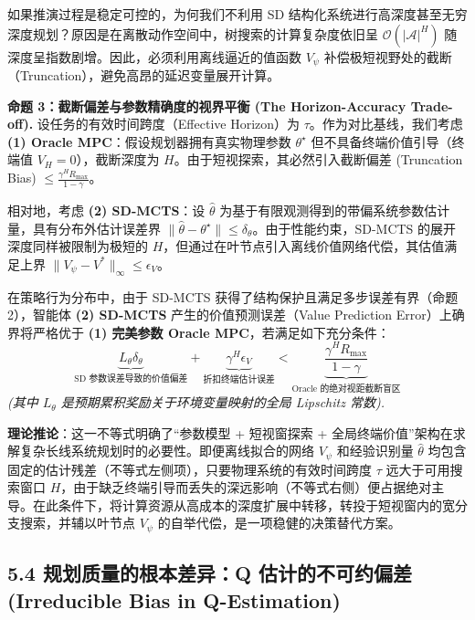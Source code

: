 \documentclass[UTF8]{ctexart}
\begin{document}
如果推演过程是稳定可控的，为何我们不利用 SD 结构化系统进行高深度甚至无穷深度规划？原因是在离散动作空间中，树搜索的计算复杂度依旧呈 \(\mathcal{O}(|\mathcal{A}|^H)\) 随深度呈指数剧增。因此，必须利用离线逼近的值函数 \(V_\psi\) 补偿极短视野处的截断（Truncation），避免高昂的延迟变量展开计算。

\textbf{命题 3：截断偏差与参数精确度的视界平衡 (The Horizon-Accuracy Trade-off). }
设任务的有效时间跨度（Effective Horizon）为 \(\tau\)。作为对比基线，我们考虑 \textbf{(1) Oracle MPC}：假设规划器拥有真实物理参数 \(\theta^\star\) 但不具备终端价值引导（终端值 \(V_H=0\)），截断深度为 \(H\)。由于短视探索，其必然引入截断偏差 (Truncation Bias) \(\le \frac{\gamma^H R_{\max}}{1-\gamma}\)。

相对地，考虑 \textbf{(2) SD-MCTS}：设 \(\hat{\theta}\) 为基于有限观测得到的带偏系统参数估计量，具有分布外估计误差界 \(\|\hat{\theta} - \theta^\star\| \leq \delta_\theta\)。由于性能约束，SD-MCTS 的展开深度同样被限制为极短的 \(H\)，但通过在叶节点引入离线价值网络代偿，其估值满足上界 \(\|V_\psi - V^*\|_\infty \leq \epsilon_V\)。

在策略行为分布中，由于 SD-MCTS 获得了结构保护且满足多步误差有界（命题 2），智能体 \textbf{(2) SD-MCTS} 产生的价值预测误差（Value Prediction Error）上确界将严格优于 \textbf{(1) 完美参数 Oracle MPC}，若满足如下充分条件：
\[
\underbrace{L_\theta \delta_\theta}_{\text{SD 参数误差导致的价值偏差}} + \underbrace{\gamma^H \epsilon_V}_{\text{折扣终端估计误差}} < \underbrace{\frac{\gamma^H R_{\max}}{1-\gamma}}_{\text{Oracle 的绝对视距截断盲区}}
\]
\emph{(其中 \(L_\theta\) 是预期累积奖励关于环境变量映射的全局 Lipschitz 常数).}

\textbf{理论推论}：这一不等式明确了``参数模型 + 短视窗探索 + 全局终端价值''架构在求解复杂长线系统规划时的必要性。即便离线拟合的网络 \(V_\psi\) 和经验识别量 \(\hat{\theta}\) 均包含固定的估计残差（不等式左侧项），只要物理系统的有效时间跨度 \(\tau\) 远大于可用搜索窗口 \(H\)，由于缺乏终端引导而丢失的深远影响（不等式右侧）便占据绝对主导。在此条件下，将计算资源从高成本的深度扩展中转移，转投于短视窗内的宽分支搜索，并辅以叶节点 $V_\psi$ 的自举代偿，是一项稳健的决策替代方案。

\hypertarget{ux89c4ux5212ux8d28ux91cfux7684ux6839ux672cux5deeux5f02q-ux4f30ux8ba1ux7684ux4e0dux53efux7ea6ux504fux5dee-irreducible-bias-in-q-estimation}{%
\subsection{5.4 规划质量的根本差异：Q 估计的不可约偏差 (Irreducible Bias
in
Q-Estimation)}\label{ux89c4ux5212ux8d28ux91cfux7684ux6839ux672cux5deeux5f02q-ux4f30ux8ba1ux7684ux4e0dux53efux7ea6ux504fux5dee-irreducible-bias-in-q-estimation}}
\end{document}
